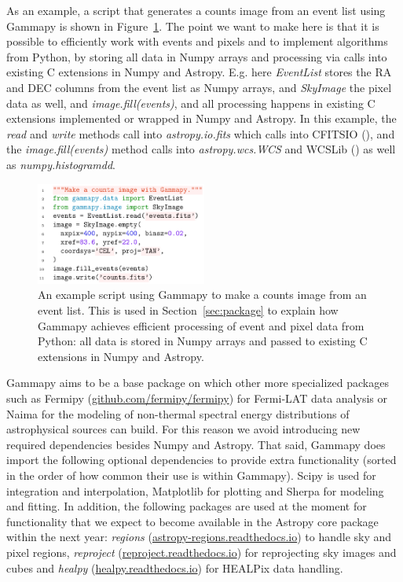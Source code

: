\documentclass{PoS}
\newcommand{\urlFermipy}{\href{https://github.com/fermipy/fermipy}{github.com/fermipy/fermipy}}
\newcommand{\urlHealpy}{\href{https://healpy.readthedocs.io}{healpy.readthedocs.io}}
\newcommand{\urlRegions}{\href{https://astropy-regions.readthedocs.io}{astropy-regions.readthedocs.io}}
\newcommand{\urlReproject}{\href{https://reproject.readthedocs.io}{reproject.readthedocs.io}}
\begin{document}
As an example, a script that generates a counts image from an event list using
Gammapy is shown in Figure~\ref{fig:code_example}. The point we want to make
here is that it is possible to efficiently work with events and pixels and to
implement algorithms from Python, by storing all data in Numpy arrays and
processing via calls into existing C extensions in Numpy and Astropy. E.g. here
{\it EventList} stores the RA and DEC columns from the event list as Numpy
arrays, and {\it SkyImage} the pixel data as well, and {\it image.fill(events)},
and all processing happens in existing C extensions implemented or wrapped in
Numpy and Astropy. In this example, the {\it read} and {\it write} methods call
into {\it astropy.io.fits} which calls into CFITSIO (\cite{cfitsio}), and the
{\it image.fill(events)} method calls into {\it astropy.wcs.WCS} and WCSLib
(\cite{wcslib}) as well as {\it numpy.histogramdd}. 

\begin{figure}[t]
\centering
\includegraphics[width=0.5\textwidth]{examples/code_events_image}
\caption{
An example script using Gammapy to make a counts image from an event list. This
is used in Section~\protect\ref{sec:package} to explain how Gammapy achieves
efficient processing of event and pixel data from Python: all data is stored in
Numpy arrays and passed to existing C extensions in Numpy and Astropy.
}
\label{fig:code_example}
\end{figure}

Gammapy aims to be a base package on which other more specialized packages such
as Fermipy (\urlFermipy) for Fermi-LAT data analysis or Naima \cite{naima} for
the modeling of non-thermal spectral energy distributions of astrophysical
sources can build. For this reason we avoid introducing new required
dependencies besides Numpy and Astropy. That said, Gammapy does import the
following optional dependencies to provide extra functionality (sorted in the
order of how common their use is within Gammapy). Scipy \cite{scipy} is used for
integration and interpolation, Matplotlib \cite{matplotlib} for plotting and
Sherpa \cite{sherpa2001, sherpa2009, sherpa2011} for modeling and fitting. In
addition, the following packages are used at the moment for functionality that
we expect to become available in the Astropy core package within the next year:
{\it regions} (\urlRegions) to handle sky and pixel regions, {\it reproject}
(\urlReproject) for reprojecting sky images and cubes and {\it healpy}
(\urlHealpy) for HEALPix data handling. 
\end{document}
